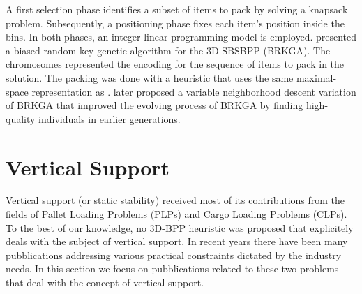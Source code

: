 A first selection phase identifies a subset of items to pack by solving a knapsack problem. Subsequently, a positioning phase fixes each item's position inside the bins.
In both phases, an integer linear programming model is employed.
\cite{gonccalves2013biased} presented a biased random-key genetic algorithm for the 3D-SBSBPP (BRKGA).
The chromosomes represented the encoding for the sequence of items to pack in the solution.
The packing was done with a heuristic that uses the same maximal-space representation as \cite{parreno2010hybrid}.
\cite{zudio2018brkga} later proposed a variable neighborhood descent variation of BRKGA that improved the evolving process of BRKGA by finding high-quality individuals in earlier generations.

\section{Vertical Support}
\label{sec:literature:support}%
Vertical support (or static stability) received most of its contributions from the fields of Pallet Loading Problems (PLPs) and Cargo Loading Problems (CLPs).
To the best of our knowledge, no 3D-BPP heuristic was proposed that explicitely deals with the subject of vertical support.
In recent years there have been many pubblications addressing various practical constraints dictated by the industry needs.
In this section we focus on pubblications related to these two problems that deal with the concept of vertical support.

